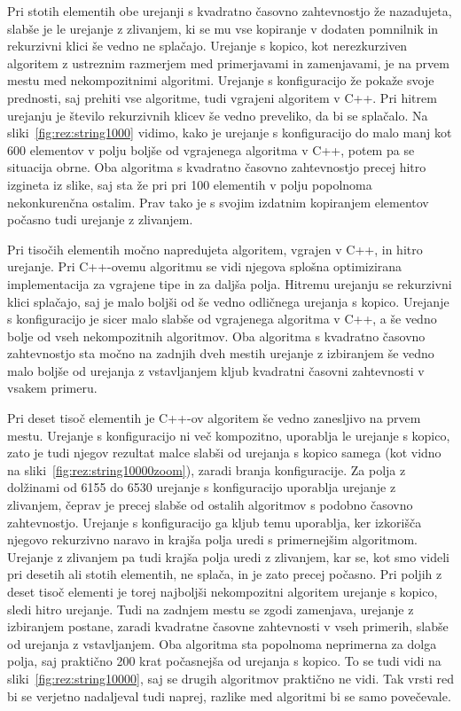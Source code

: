 \documentclass[a4paper,oneside,12pt]{article}
\begin{document}
Pri stotih elementih obe urejanji s kvadratno časovno zahtevnostjo že nazadujeta, slabše je le urejanje z zlivanjem,
ki se mu vse kopiranje v dodaten pomnilnik in rekurzivni klici 
še vedno ne splačajo. Urejanje s kopico, kot nerezkurziven algoritem
z ustreznim razmerjem med primerjavami in zamenjavami, je na prvem mestu med nekompozitnimi algoritmi.
Urejanje s konfiguracijo že pokaže svoje prednosti, saj prehiti vse algoritme, tudi vgrajeni 
algoritem v C++. Pri hitrem urejanju je število rekurzivnih klicev še vedno preveliko, da bi se splačalo.
Na sliki~\ref{fig:rez:string1000} vidimo, kako je urejanje s konfiguracijo do
malo manj kot 600 elementov v polju boljše od vgrajenega algoritma v C++, potem
pa se situacija obrne. Oba algoritma s kvadratno časovno zahtevnostjo precej
hitro izgineta iz slike, saj sta že pri pri 100 elementih v polju popolnoma
nekonkurenčna ostalim. Prav tako je s svojim izdatnim kopiranjem elementov
počasno tudi urejanje z zlivanjem.

Pri tisočih elementih močno napredujeta algoritem, vgrajen v C++, in hitro urejanje. Pri \mbox{C++-ovemu} algoritmu
se vidi njegova splošna optimizirana implementacija za vgrajene tipe in za daljša polja. Hitremu urejanju se 
rekurzivni klici splačajo, saj je malo boljši od še vedno odličnega urejanja s kopico. Urejanje s konfiguracijo 
je sicer malo slabše od vgrajenega algoritma v C++, a še vedno bolje od vseh nekompozitnih algoritmov.
Oba algoritma s kvadratno časovno zahtevnostjo sta močno na zadnjih dveh mestih urejanje z izbiranjem 
še vedno malo boljše od urejanja z vstavljanjem kljub kvadratni časovni zahtevnosti v vsakem primeru.

Pri deset tisoč elementih je \mbox{C++-ov} algoritem še vedno zanesljivo na prvem mestu. Urejanje s 
konfiguracijo ni več kompozitno, uporablja le urejanje s kopico, zato je tudi
njegov rezultat malce slabši od urejanja s kopico samega (kot vidno na
sliki~\ref{fig:rez:string10000zoom}), zaradi branja
konfiguracije. Za polja z dolžinami od 6155 do 6530 urejanje s konfiguracijo uporablja
urejanje z zlivanjem, čeprav je precej slabše od ostalih algoritmov s podobno časovno zahtevnostjo. Urejanje s
konfiguracijo ga kljub temu uporablja, ker izkorišča njegovo rekurzivno naravo in krajša polja uredi s
primernejšim algoritmom. Urejanje z zlivanjem pa tudi krajša polja uredi z zlivanjem, kar se, kot smo 
videli pri desetih ali stotih elementih, ne splača, in je zato precej počasno.
Pri poljih z deset tisoč elementi je torej najboljši nekompozitni algoritem 
urejanje s kopico, sledi hitro urejanje. Tudi na zadnjem mestu se zgodi zamenjava, urejanje z izbiranjem
postane, zaradi kvadratne časovne zahtevnosti v vseh primerih, slabše od %
urejanja z vstavljanjem. Oba algoritma sta popolnoma neprimerna za dolga polja,
saj praktično 200 krat počasnejša od urejanja s kopico. To se tudi vidi na
sliki~\ref{fig:rez:string10000}, saj se drugih algoritmov praktično ne vidi.
Tak vrsti red bi se verjetno nadaljeval tudi naprej, razlike med algoritmi bi se
samo povečevale.
\end{document}
